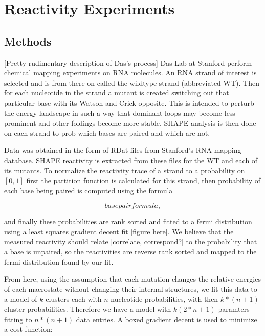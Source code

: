 \chapter{Reactivity Experiments}
\section{Methods} [Pretty rudimentary description of Das's process]
Das Lab at Stanford perform chemical mapping experiments on RNA
molecules. An RNA strand of interest is selected and is from there on
called the wildtype strand (abbreviated WT). Then for each nucleotide
in the strand a mutant is created switching out that particular base
with its Watson and Crick opposite. This is intended to perturb the
energy landscape in such a way that dominant loops may become less
prominent and other foldings become more stable. SHAPE analysis is
then done on each strand to prob which bases are paired and which are
not.

Data was obtained in the form of RDat files from Stanford's RNA
mapping database. SHAPE reactivity is extracted from these files for
the WT and each of its mutants. To normalize the reactivity trace of a
strand to a probability on $[0, 1]$ first the partition function is
calculated for this strand, then probability of each base being paired
is computed using the formula

$$ base pair formula ,$$

and finally these probabilities are rank sorted and fitted to a fermi
distribution using a least squares gradient decent fit [figure
here]. We believe that the measured reactivity should relate
[correlate, correspond?] to the probability that a base is unpaired,
so the reactivities are reverse rank sorted and mapped to the fermi
distribution found by our fit.

From here, using the assumption that each mutation changes the
relative energies of each macrostate without changing their internal
structures, we fit this data to a model of $k$ clusters each with $n$
nucleotide probabilities, with then $k*(n+1)$ cluster
probabilities. Therefore we have a model with $k(2*n + 1)$ paramters
fitting to $n*(n+1)$ data entries. A boxed gradient decent is used to
minimize a cost function:

